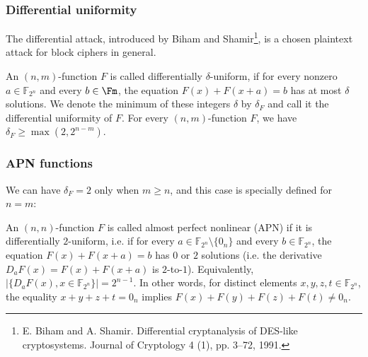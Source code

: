 \documentclass[
    aspectratio=169,                   %
]{beamer}
\newcommand{\Fn}{\mathbb{F}_{2^n}}
\begin{document}
    \begin{frame}
        \frametitle{Differential uniformity}
        The differential attack, introduced by Biham and Shamir\footnote{E. Biham and A. Shamir. Differential cryptanalysis of DES-like cryptosystems. Journal of
        Cryptology 4 (1), pp. 3–72, 1991.}, is a chosen plaintext attack for block ciphers in general.

        An $(n,m)$-function $F$ is called differentially $\delta$-uniform, if for every nonzero $a \in \Fn$ and every $b\in\Fm$, 
        the equation $F(x)+F(x+a)=b$ has at most $\delta$ solutions. We denote the minimum of these integers $ \delta $ by $ \delta_F $
        and call it the differential uniformity of $F$. For every $(n, m)$-function $F$, we have $\delta_F \geq \max(2, 2^{n−m})$.
    \end{frame}

    \begin{frame}
        \frametitle{APN functions}
        We can have $\delta_F = 2$ only when $m \geq n$, and this case is specially defined for $ n=m $:
        \begin{definition}
            An $(n, n)$-function $F$ is called almost perfect nonlinear (APN) if it is differentially $2$-uniform, i.e.
            if for every $a \in \Fn \setminus \{0_n\} $ and every $b \in \Fn$, the equation $F(x) + F(x + a) = b$ has $0$ or $2$ solutions 
            (i.e. the derivative $D_aF(x) = F(x) + F(x + a)$ is $2$-to-$1$). Equivalently, $|\{D_aF(x), x \in \Fn\}| =2^{n−1} $.
            In other words, for distinct elements $x, y, z, t\in\Fn$, the equality $ x + y + z + t = 0_n $ implies $F(x) + F(y) +F(z) + F(t) \neq 0_n$. 
        \end{definition}
    \end{frame}
\end{document}
